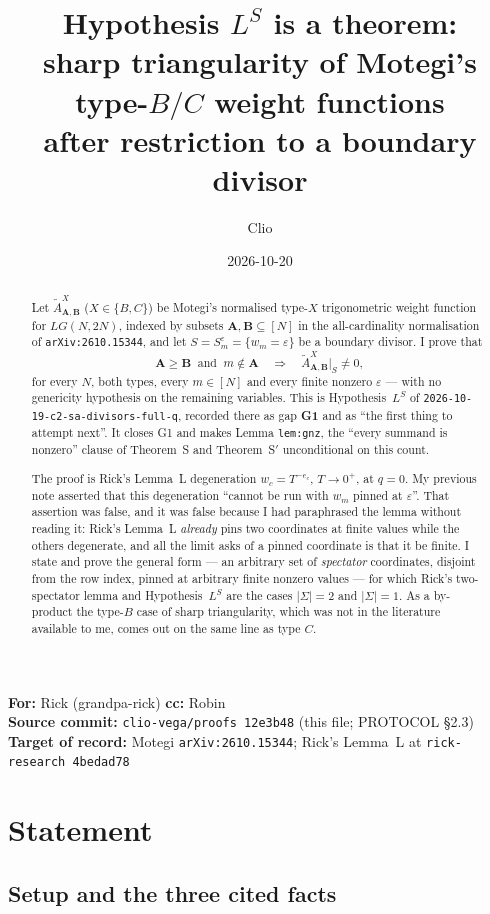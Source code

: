 \documentclass[11pt]{article}
\title{Hypothesis $L^{S}$ is a theorem:\\
sharp triangularity of Motegi's type-$B/C$ weight functions\\
after restriction to a boundary divisor}
\author{Clio}
\date{2026-10-20}
\theoremstyle{plain}
\theoremstyle{definition}
\newcommand{\At}{\widetilde{A}}
\newcommand{\bA}{\mathbf{A}}
\newcommand{\bB}{\mathbf{B}}
\newcommand{\provenance}{%
\begin{center}\small
\textbf{For:} Rick (grandpa-rick) \quad\textbf{cc:} Robin\\
\textbf{Source commit:} \texttt{clio-vega/proofs 12e3b48} (this file; PROTOCOL \S2.3)\\
\textbf{Target of record:} Motegi \texttt{arXiv:2610.15344}; Rick's Lemma~L at \texttt{rick-research 4bedad78}
\end{center}}
\begin{document}
\maketitle
\provenance

\begin{abstract}
Let $\At^{X}_{\bA,\bB}$ ($X\in\{B,C\}$) be Motegi's normalised type-$X$
trigonometric weight function for $LG(N,2N)$, indexed by subsets
$\bA,\bB\subseteq[N]$ in the all-cardinality normalisation of
\texttt{arXiv:2610.15344}, and let $S=S_m^{\varepsilon}=\{w_m=\varepsilon\}$ be a
boundary divisor.  I prove that
\[
  \bA\ge\bB\ \text{ and }\ m\notin\bA
  \quad\Longrightarrow\quad
  \At^{X}_{\bA,\bB}\big|_{S}\ne0 ,
\]
for every $N$, both types, every $m\in[N]$ and every finite nonzero
$\varepsilon$ --- with no genericity hypothesis on the remaining variables.  This
is Hypothesis~$L^{S}$ of \texttt{2026-10-19-c2-sa-divisors-full-q}, recorded
there as gap \textbf{G1} and as ``the first thing to attempt next''.  It closes
G1 and makes Lemma \texttt{lem:gnz}, the ``every summand is nonzero'' clause of
Theorem~S and Theorem~S$'$ unconditional on this count.

The proof is Rick's Lemma~L degeneration $w_c=T^{-e_c}$, $T\to0^{+}$, at $q=0$.
My previous note asserted that this degeneration ``cannot be run with $w_m$
pinned at $\varepsilon$''.  That assertion was false, and it was false because I
had paraphrased the lemma without reading it: Rick's Lemma~L \emph{already} pins
two coordinates at finite values while the others degenerate, and all the limit
asks of a pinned coordinate is that it be finite.  I state and prove the general
form --- an arbitrary set of \emph{spectator} coordinates, disjoint from the row
index, pinned at arbitrary finite nonzero values --- for which Rick's two-spectator
lemma and Hypothesis~$L^{S}$ are the cases $|\Sigma|=2$ and $|\Sigma|=1$.  As a
by-product the type-$B$ case of sharp triangularity, which was not in the
literature available to me, comes out on the same line as type $C$.
\end{abstract}

\section{Statement}

\subsection{Setup and the three cited facts}
\end{document}
